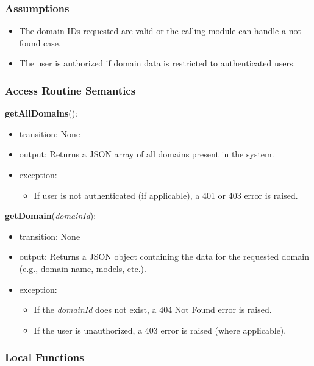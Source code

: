 \documentclass[12pt, titlepage]{article}
\begin{document}
\subsubsection{Assumptions}

\begin{itemize}
  \item The domain IDs requested are valid or the calling module can handle a not-found case.
  \item The user is authorized if domain data is restricted to authenticated users.
\end{itemize}

\subsubsection{Access Routine Semantics}

\noindent \textbf{getAllDomains}():
\begin{itemize}
\item transition: None
\item output: Returns a JSON array of all domains present in the system.
\item exception: 
  \begin{itemize}
    \item If user is not authenticated (if applicable), a 401 or 403 error is raised.
  \end{itemize}
\end{itemize}

\noindent \textbf{getDomain}(\textit{domainId}):
\begin{itemize}
\item transition: None
\item output: Returns a JSON object containing the data for the requested domain (e.g., domain name, models, etc.).
\item exception:
  \begin{itemize}
    \item If the \textit{domainId} does not exist, a 404 Not Found error is raised.
    \item If the user is unauthorized, a 403 error is raised (where applicable).
  \end{itemize}
\end{itemize}

\subsubsection{Local Functions}
\end{document}
